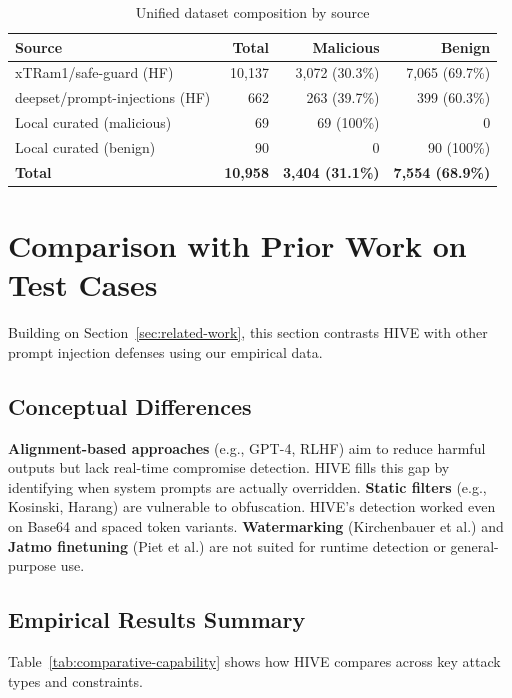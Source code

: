 \documentclass[manuscript,screen,review]{acmart}
\begin{document}
\begin{table}[h]
\caption{Unified dataset composition by source}
\label{tab:dataset-composition}
\centering
\small
\begin{tabular}{lrrr}
\toprule
\textbf{Source} & \textbf{Total} & \textbf{Malicious} & \textbf{Benign} \\
\midrule
xTRam1/safe-guard (HF) & 10{,}137 & 3{,}072 (30.3\%) & 7{,}065 (69.7\%) \\
deepset/prompt-injections (HF) & 662 & 263 (39.7\%) & 399 (60.3\%) \\
Local curated (malicious) & 69 & 69 (100\%) & 0 \\
Local curated (benign) & 90 & 0 & 90 (100\%) \\
\midrule
\textbf{Total} & \textbf{10{,}958} & \textbf{3{,}404 (31.1\%)} & \textbf{7{,}554 (68.9\%)} \\
\bottomrule
\end{tabular}
\end{table}

\section{Comparison with Prior Work on Test Cases}
\label{sec:comparison}

Building on Section~\ref{sec:related-work}, this section contrasts HIVE with other prompt injection defenses using our empirical data.

\subsection{Conceptual Differences}
\textbf{Alignment-based approaches} (e.g., GPT-4, RLHF) aim to reduce harmful outputs but lack real-time compromise detection. HIVE fills this gap by identifying when system prompts are actually overridden.\newline
\textbf{Static filters} (e.g., Kosinski, Harang) are vulnerable to obfuscation. HIVE's detection worked even on Base64 and spaced token variants.\newline
\textbf{Watermarking} (Kirchenbauer et al.) and \textbf{Jatmo finetuning} (Piet et al.) are not suited for runtime detection or general-purpose use.

\subsection{Empirical Results Summary}
Table~\ref{tab:comparative-capability} shows how HIVE compares across key attack types and constraints.
\end{document}
